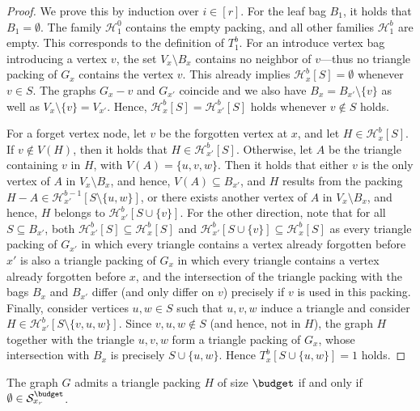 \documentclass[a4paper,UKenglish,cleveref, autoref, thm-restate]{lipics-v2021}
\begin{document}
\begin{proof}
    We prove this by induction over $i\in[r]$. For the leaf bag $B_1$, it holds that $B_1 = \emptyset$. The family $\mathcal{H}_1^0$ contains the empty packing, and all other families $\mathcal{H}_1^b$ are empty. This corresponds to the definition of $T_1^b$.
    For an introduce vertex bag introducing a vertex $v$, the set $V_x\setminus B_x$ contains no neighbor of $v$---thus no triangle packing of $G_x$ contains the vertex $v$.
    This already implies $\mathcal{H}_x^b[S] = \emptyset$ whenever $v \in S$. 
    The graphs $G_x - v$ and $G_{x'}$ coincide and we also have $B_x = B_{x'} \setminus \{v\}$ as well as $V_x \setminus \{v\} = V_{x'}$.
    Hence, $\mathcal{H}_x^b[S] = \mathcal{H}_{x'}^b[S]$ holds whenever $v \notin S$ holds.

    For a forget vertex node, let $v$ be the forgotten vertex at $x$, and let $H\in\mathcal{H}_x^b[S]$. If $v\notin V(H)$, then it holds that $H\in\mathcal{H}_{x'}^b[S]$. Otherwise, let $A$ be the triangle containing $v$ in $H$, with $V(A)=\{u,v,w\}$. Then it holds that either $v$ is the only vertex of $A$ in $V_x\setminus B_x$, and hence, $V(A)\subseteq B_{x'}$, and $H$ results from the packing $H - A \in \mathcal{H}_{x'}^{b-1}[S\setminus\{u,w\}]$,
    or there exists another vertex of $A$ in $V_x\setminus B_x$, and hence, $H$ belongs to $\mathcal{H}_{x'}^b[S\cup \{v\}]$.
    For the other direction, note that for all $S\subseteq B_{x'}$, both $\mathcal{H}_{x'}^b[S] \subseteq \mathcal{H}_{x}^b[S]$ and $\mathcal{H}_{x'}^b[S \cup \{v\}] \subseteq \mathcal{H}_{x}^b[S]$ as every triangle packing of $G_{x'}$ in which every triangle contains a vertex already forgotten before $x'$ is also a triangle packing of $G_x$ in which every triangle contains a vertex already forgotten before $x$, and the intersection of the triangle packing with the bags $B_x$ and $B_{x'}$ differ (and only differ on $v$) precisely if $v$ is used in this packing.
    Finally, consider vertices $u, w \in S$ such that $u, v, w$ induce a triangle and consider $H \in \mathcal{H}_{x'}^b[S \setminus \{v, u, w\}]$.
    Since $v, u, w \notin S$ (and hence, not in $H$), the graph $H$ together with the triangle $u, v, w$ form a triangle packing of $G_x$, whose intersection with $B_x$ is precisely $S\cup\{u,w\}$. Hence $T_x^b[S\cup\{u,w\}] = 1$ holds.
\end{proof}

\begin{corollary}\label{tripack::cor:algo-correct}
    The graph $G$ admits a triangle packing $H$ of size $\budget$ if and only if $\emptyset \in \mathcal{S}_{x_r}^{\budget}$.
\end{corollary}
\end{document}
